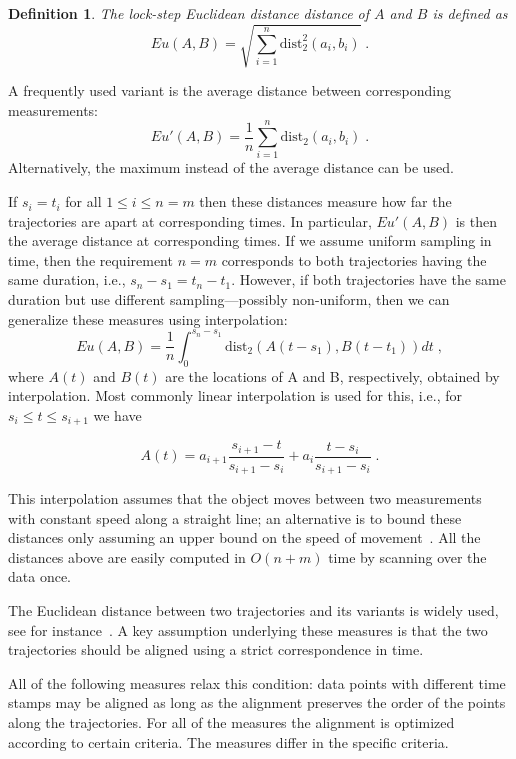 \documentclass[10pt,letterpaper]{article}
\newcommand{\dist}{\ensuremath{\text{dist}}}
\newtheorem{definition}{Definition}
\begin{document}
\begin{definition}
The lock-step Euclidean distance distance of $A$ and $B$ is defined as
\[
Eu(A,B) = \sqrt {\sum_{i=1}^n \dist_2^2(a_i,b_i)}\;.
\]
\end{definition}

A frequently used variant is the average distance between corresponding measurements: 
\[
Eu'(A,B) = \frac{1}{n}\sum_{i=1}^n \dist_2(a_i,b_i)\;.
\]
Alternatively, the maximum instead of the average distance can be used.

If $s_i = t_i$ for all $1 \leq i \leq n=m$ then these distances measure how far the trajectories are apart at corresponding times. In particular, $Eu'(A,B)$ is then the average distance at corresponding times.
If we assume uniform sampling in time, then the requirement $n=m$ corresponds to both trajectories having the same duration, i.e., $s_n - s_1 = t_n - t_1$. However, if both trajectories have the same duration but use different sampling---possibly non-uniform, then we can generalize these measures using interpolation:
\[
Eu(A,B) = \frac{1}{n}\int_0^{s_n-s_1} \dist_2(A(t-s_1),B(t-t_1)) dt\;,
\]
 where $A(t)$ and $B(t)$ are the locations of A and B, respectively, obtained by interpolation. Most commonly linear interpolation is used for this, i.e., for $s_i \leq t \leq s_{i+1}$ we have

\begin{equation}
\label{eq:interpolated_traj}
 A(t) = a_{i+1} \frac{s_{i+1}-t}{s_{i+1}-s_i}  + a_i \frac{t -s_i}{s_{i+1}-s_i}\;.
\end{equation}

This interpolation assumes that the  object moves between two measurements with constant speed along a straight line; an alternative is to bound these distances only assuming an upper bound on the speed of movement~\cite{DBLP:conf/gis/BuchinP13}. All the distances above are easily computed in $O(n+m)$ time by scanning over the data once.

The Euclidean distance between two trajectories and its variants is widely used, see for instance~\cite{VlachosGK02}. A key assumption underlying these measures is that the two trajectories should be aligned using a strict correspondence in time.

All of the following measures relax this condition: data points with different time stamps may be aligned as long as the alignment preserves the order of the points along the trajectories. For all of the measures the alignment is optimized according to certain criteria. The measures differ in the specific criteria.
\end{document}
